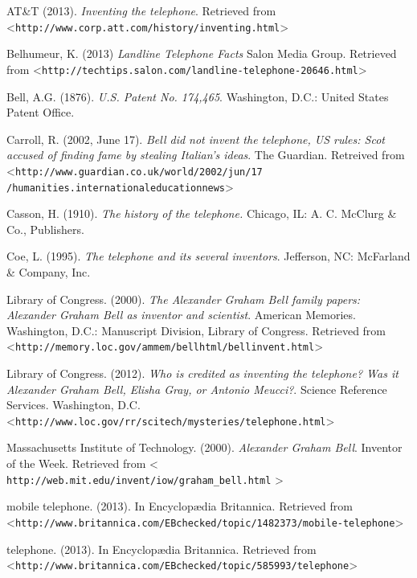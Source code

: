 \documentclass[12pt singlecol]{article}
\begin{document}
\begin{flushleft}
\begin{thebibliography}{99\kern\bibindent}
	 AT\&T (2013). \emph{Inventing the telephone}. Retrieved from \textless\texttt{http://www.corp.att.com/history/inventing.html}\textgreater 

	 Belhumeur, K. (2013) \emph{Landline Telephone Facts} Salon Media Group. Retrieved from \textless\texttt{http://techtips.salon.com/landline-telephone-20646.html}\textgreater

	 Bell, A.G. (1876). \emph{U.S. Patent No. 174,465}. Washington, D.C.: United States Patent Office. 

	 Carroll, R. (2002, June 17). \emph{Bell did not invent the telephone, US rules: Scot accused of finding fame by stealing Italian's ideas}. The Guardian. Retreived from \textless\texttt{http://www.guardian.co.uk/world/2002/jun/17\\/humanities.internationaleducationnews}\textgreater

	 Casson, H. (1910). \emph{The history of the telephone.} Chicago, IL: A. C. McClurg \& Co., Publishers.

	 Coe, L. (1995). \emph{The telephone and its several inventors}. Jefferson, NC: McFarland \& Company, Inc.

	 Library of Congress. (2000). \emph{The Alexander Graham Bell family papers: Alexander Graham Bell as inventor and scientist}. American Memories. Washington, D.C.: Manuscript Division, Library of Congress. Retrieved from \textless\texttt{http://memory.loc.gov/ammem/bellhtml/bellinvent.html}\textgreater

	 Library of Congress. (2012). \emph{Who is credited as inventing the telephone? Was it Alexander Graham Bell, Elisha Gray, or Antonio Meucci?}. Science Reference Services. Washington, D.C. \textless\texttt{http://www.loc.gov/rr/scitech/mysteries/telephone.html}\textgreater

	 Massachusetts Institute of Technology. (2000). \emph{Alexander Graham Bell}. Inventor of the Week. Retrieved from \textless\texttt{ http://web.mit.edu/invent/iow/graham\_bell.html} \textgreater

	 mobile telephone. (2013). In Encyclop\ae dia Britannica. Retrieved from \textless\texttt{http://www.britannica.com/EBchecked/topic/1482373/mobile-telephone}\textgreater

	 telephone. (2013). In Encyclop\ae dia Britannica. Retrieved from \textless\texttt{http://www.britannica.com/EBchecked/topic/585993/telephone}\textgreater

\end{thebibliography}

\end{flushleft}
\end{document}
